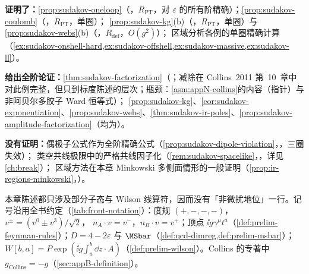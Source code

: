 \begin{tcolorbox}[enhanced,breakable,title=本章证明了什么／没有证明什么,fonttitle=\bfseries,
  colback=gray!3!white,colframe=gray!55!black,boxrule=0.6pt,arc=2pt,
  left=5pt,right=5pt,top=3pt,bottom=3pt,before skip=6pt,after skip=6pt]
\textbf{证明了：}\cref{prop:sudakov-oneloop}（\tagR，$R_{\mathrm{PT}}$，对 $\varepsilon$ 的所有阶精确）；\cref{prop:sudakov-coulomb}（\tagR，$R_{\mathrm{PT}}$，单圈）；
\cref{prop:sudakov-kg}(b)（\tagR，$R_{\mathrm{PT}}$，单圈）与\cref{prop:sudakov-webs}(b)（\tagR，$R_{\mathrm{def}}$，$O(g^2)$）；
区域分析各例的单圈精确计算（\cref{ex:sudakov-onshell-hard,ex:sudakov-offshell,ex:sudakov-massive,ex:sudakov-ll}）。\par
\textbf{给出全阶论证：}\cref{thm:sudakov-factorization}（\tagA；减除在 Collins~2011 第~10~章中对此例完整，但只到标度陈述的层次；瓶颈：\cref{asm:appN-collins}的内容（指针）与非阿贝尔多胶子 Ward 恒等式）；
\cref{prop:sudakov-kg}、\cref{cor:sudakov-exponentiation}、\cref{prop:sudakov-webs}、\cref{thm:sudakov-ir-poles}、\cref{prop:sudakov-amplitude-factorization}（均为\tagA）。\par
\textbf{没有证明：}偶极子公式作为全阶精确公式（\cref{prop:sudakov-dipole-violation}，\tagV，三圈失效）；
类空共线极限中的严格共线因子化（\cref{rem:sudakov-spacelike}，\tagV，详见\cref{ch:break}）；
区域方法在本章 Minkowski 多侧面情形的一般证明（\cref{prop:ir-regions-minkowski}，\tagP）。
\end{tcolorbox}

本章陈述都只涉及部分子态与 Wilson 线算符，因而没有「非微扰地位」一行。记号沿用全书约定（\cref{tab:front-notation}）：度规 $(+,-,-,-)$，$v^\pm=(v^0\pm v^3)/\sqrt2$，
$n_A\cdot v=v^-$，$n_B\cdot v=v^+$；顶点 $\ii g\gamma^\mu t^a$（\cref{def:prelim-feynman-rules}）；$D=4-2\varepsilon$ 与 $\MSbar$（\cref{def:qcd-dimreg,def:prelim-msbar}）；
$W[b,a]=P\exp(\ii g\int_a^b\dd z\cdot A)$（\cref{def:prelim-wilson}）。Collins 的专著\cite{Collins2011}中 $g_{\mathrm{Collins}}=-g$（\cref{sec:appB-definition}）。
